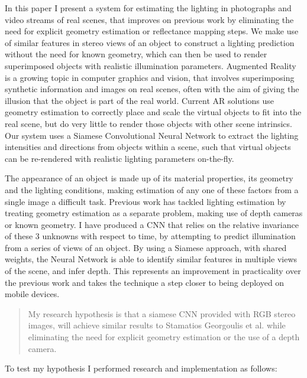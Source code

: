\documentclass[ %
                    author={Gavin Parker},
                supervisor={Dr. Neill Campbell},
                    degree={MEng},
                     title={Deep Siamese Networks for Illumination Estimation from Stereo Images},
                  subtitle={},
                      type={research},
                      year={2018} ]{dissertation}
\begin{document}
\noindent
In this paper I present a system for estimating the lighting in photographs and video streams of real scenes, that improves on previous work by eliminating the need for explicit geometry estimation or reflectance mapping steps. We make use of similar features in stereo views of an object to construct a lighting prediction without the need for known geometry, which can then be used to render superimposed objects with realistic illumination parameters.
\newline
Augmented Reality is a growing topic in computer graphics and vision, that involves superimposing synthetic information and images on real scenes, often with the aim of giving the illusion that the object is part of the real world. Current AR solutions use geometry estimation to correctly place and scale the virtual objects to fit into the real scene, but do very little to render those objects with other scene intrinsics. Our system uses a Siamese Convolutional Neural Network to extract the lighting intensities and directions from objects within a scene, such that virtual objects can be re-rendered with realistic lighting parameters on-the-fly.

The appearance of an object is made up of its material properties, its geometry and the lighting conditions, making estimation of any one of these factors from a single image a difficult task. Previous work has tackled lighting estimation by treating geometry estimation as a separate problem, making use of depth cameras or known geometry. I have produced a CNN that relies on the relative invariance of these 3 unknowns with respect to time, by attempting to predict illumination from a series of views of an object. By using a Siamese approach, with shared weights, the Neural Network is able to identify similar features  in multiple views of the scene, and infer depth. This represents an improvement in practicality over the previous work and takes the technique a step closer to being deployed on mobile devices.

\begin{quote}
My research hypothesis is that a siamese CNN provided with RGB stereo images, will achieve similar results to Stamatios Georgoulis et al. while eliminating the need for explicit geometry estimation or the use of a depth camera.
\end{quote}

To test my hypothesis I performed research and implementation as follows:
\end{document}
